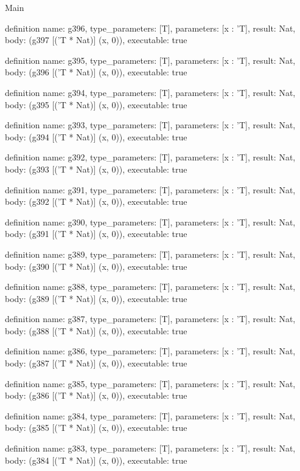 \begin{lexlean}{Main}
\begin{semanticmodule}
definition{
  name: g396,
  type_parameters: [T],
  parameters: [x : 'T],
  result: Nat,
  body: (g397 [('T * Nat)] (x, 0)),
  executable: true
}

definition{
  name: g395,
  type_parameters: [T],
  parameters: [x : 'T],
  result: Nat,
  body: (g396 [('T * Nat)] (x, 0)),
  executable: true
}

definition{
  name: g394,
  type_parameters: [T],
  parameters: [x : 'T],
  result: Nat,
  body: (g395 [('T * Nat)] (x, 0)),
  executable: true
}

definition{
  name: g393,
  type_parameters: [T],
  parameters: [x : 'T],
  result: Nat,
  body: (g394 [('T * Nat)] (x, 0)),
  executable: true
}

definition{
  name: g392,
  type_parameters: [T],
  parameters: [x : 'T],
  result: Nat,
  body: (g393 [('T * Nat)] (x, 0)),
  executable: true
}

definition{
  name: g391,
  type_parameters: [T],
  parameters: [x : 'T],
  result: Nat,
  body: (g392 [('T * Nat)] (x, 0)),
  executable: true
}

definition{
  name: g390,
  type_parameters: [T],
  parameters: [x : 'T],
  result: Nat,
  body: (g391 [('T * Nat)] (x, 0)),
  executable: true
}

definition{
  name: g389,
  type_parameters: [T],
  parameters: [x : 'T],
  result: Nat,
  body: (g390 [('T * Nat)] (x, 0)),
  executable: true
}

definition{
  name: g388,
  type_parameters: [T],
  parameters: [x : 'T],
  result: Nat,
  body: (g389 [('T * Nat)] (x, 0)),
  executable: true
}

definition{
  name: g387,
  type_parameters: [T],
  parameters: [x : 'T],
  result: Nat,
  body: (g388 [('T * Nat)] (x, 0)),
  executable: true
}

definition{
  name: g386,
  type_parameters: [T],
  parameters: [x : 'T],
  result: Nat,
  body: (g387 [('T * Nat)] (x, 0)),
  executable: true
}

definition{
  name: g385,
  type_parameters: [T],
  parameters: [x : 'T],
  result: Nat,
  body: (g386 [('T * Nat)] (x, 0)),
  executable: true
}

definition{
  name: g384,
  type_parameters: [T],
  parameters: [x : 'T],
  result: Nat,
  body: (g385 [('T * Nat)] (x, 0)),
  executable: true
}

definition{
  name: g383,
  type_parameters: [T],
  parameters: [x : 'T],
  result: Nat,
  body: (g384 [('T * Nat)] (x, 0)),
  executable: true
}


\end{semanticmodule}
\end{lexlean}
